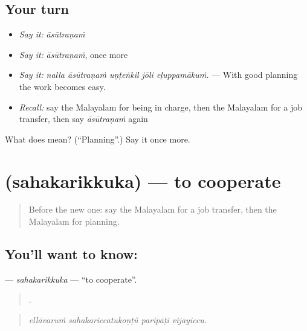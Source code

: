 \subsection*{Your turn}
\begin{itemize}
\raggedright
  \item \emph{Say it:} \emph{āsūtraṇaṁ}
  \item \emph{Say it:} \emph{āsūtraṇaṁ}, once more
  \item \emph{Say it:} \emph{nalla āsūtraṇaṁ uṇṭeṅkil jōli eḷuppamākuṁ.} — With good planning the work becomes easy.
  \item \emph{Recall:} say the Malayalam for being in charge, then the Malayalam for a job transfer, then say \emph{āsūtraṇaṁ} again
\end{itemize}

\begin{tcolorbox}[breakable,colback=teal!4,colframe=teal!35!black,title={Before you move on}]
What does  mean? (\textquotedblleft{}Planning\textquotedblright{}.) Say it once more.
\end{tcolorbox}
\section[\texorpdfstring{\ml{സഹകരിക്കുക} (sahakarikkuka)}{സഹകരിക്കുക (sahakarikkuka)}]{ (sahakarikkuka) — to cooperate}

\label{lesson:ML-C545-sahakarikkuka}



\begin{quote}
Before the new one: say the Malayalam for a job transfer, then the Malayalam for planning.
\end{quote}

\subsection*{You'll want to know: }
\textbf{} — \emph{sahakarikkuka} — \textquotedblleft{}to cooperate\textquotedblright{}.

\begin{quote}
   .
\end{quote}

\begin{quote}
\emph{ellāvaruṁ sahakariccatukoṇṭŭ paripāṭi vijayiccu.}
\end{quote}

